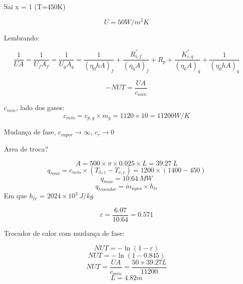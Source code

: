 \documentclass[a4paper, 12pt]{article}
\begin{document}
Sai x = 1 (T=450K)

\[U = 50 W/m^{2}K\]

Lembrando:

\[
\frac{1}{UA}=\frac{1}{U_{f}A_{f}}=\frac{1}{U_{q}A_{q}}=\frac{1}{(\eta_{0}hA)_{f}}+\frac{R_{i,f}^{''}}{(\eta_{0}A)_{f}}+ R_{p}+\frac{K_{i,q}^{''}}{(\eta _{0}A)_{q}} + \frac{1}{(\eta_{0}hA)_{q}}
\]

\[- NUT = \frac{UA}{c_{min}}\]

$c_{min}$, lado dos gases:
\[c_{min}=c_{p,g} \times \dot{m}_{g} = 1120 \times 10 = 11200 W/K\]

Mudança de fase, $c_{vapor} \rightarrow \infty$, $c_{r} \rightarrow 0$

Area de troca?

\[A = 500 \times \pi \times 0.025 \times L = 39.27 \ L\]
\[q_{max} = c_{min} \times (T_{h,e}-T_{c,e}) = 1200 \times (1400 - 450)\]
\[q_{max}= 10.64 \ MW\]
\[q_{trocador}=\dot{m}_{agua} \times h_{lv}\]
Em que $h_{lv}$ = $2024 \times 10^{3} \ J/kg$

\[\varepsilon = \frac{6.07}{10.64}=0.571\]

Trocador de calor com mudança de fase:

\[NUT = -\ln(1-\varepsilon)\]
\[NUT = -\ln(1-0.845)\]
\[NUT = \frac{UA}{c_{min}} = \frac{50 \times 39.27L}{ 11200 }\]
\[L = 4.82 m\]
\end{document}
